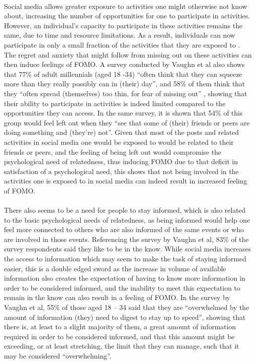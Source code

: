     \paragraph{}
      Social media allows greater exposure to activities one might otherwise not know about, increasing the number of opportunities for one to participate in activities. However, an individual's capacity to participate in these activities remains the same, due to time and resource limitations. As a result, individuals can now participate in only a small fraction of the activities that they are exposed to \cite{przybylski2013motivational}. The regret and anxiety that might follow from missing out on these activities can then induce feelings of FOMO. A survey conducted by Vaughn et al also shows that 77\% of adult millennials (aged 18 -34) “often think that they can squeeze more than they really possibly can in (their) day”, and 58\% of them think that they “often spread (themselves) too thin, for fear of missing out” \cite{Vaughn2012Fear}, showing that their ability to participate in activities is indeed limited compared to the opportunities they can access. In the same survey, it is shown that 54\% of this group would feel left out when they “see that some of (their) friends or peers are doing something and (they’re) not”. Given that most of the posts and related activities in social media one would be exposed to would be related to their friends or peers, and the feeling of being left out would compromise the psychological need of relatedness, thus inducing FOMO due to that deficit in satisfaction of a psychological need, this shows that not being involved in the activities one is exposed to in social media can indeed result in increased feeling of FOMO.
    \paragraph{}
      There also seems to be a need for people to stay informed, which is also related to the basic psychological needs of relatedness, as being informed would help one feel more connected to others who are also informed of the same events or who are involved in those events. Referencing the survey by Vaughn et al, 83\% of the survey respondents said they like to be in the know. While social media increases the access to information which may seem to make the task of staying informed easier, this is a double edged sword as the increase in volume of available information also creates the expectation of having to know more information in order to be considered informed, and the inability to meet this expectation to remain in the know can also result in a feeling of FOMO. In the survey by Vaughn et al, 55\% of those aged 18 – 34 said that they are “overwhelmed by the amount of information (they) need to digest to stay up to speed”, showing that there is, at least to a slight majority of them, a great amount of information required in order to be considered informed, and that this amount might be exceeding, or at least stretching, the limit that they can manage, such that it may be considered “overwhelming”.
